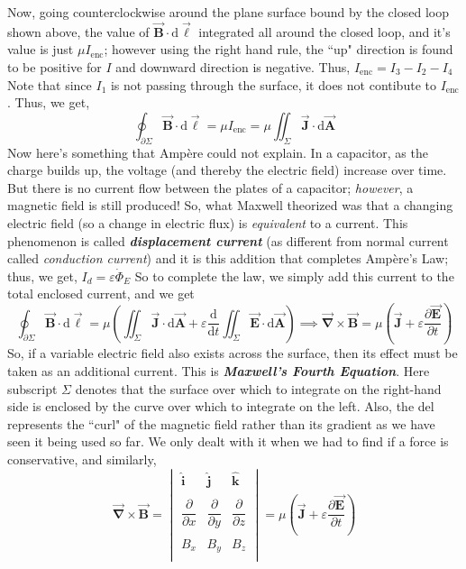 \documentclass{scrartcl}
\begin{document}
    Now, going counterclockwise around the plane surface bound by the closed loop shown above, the value of $\vec{\mathbf B}\cdot\mathrm d\vec{\mathbf\ell}$ integrated all around the closed loop, and it's value is just $\mu I_\text{enc}$; however using the right hand rule, the ``up" direction is found to be positive for $I$ and downward direction is negative. Thus, $\boxed{I_\text{enc}=I_3-I_2-I_4}$ Note that since $I_1$ is not passing through the surface, it does not contibute to $I_\text{enc}$. Thus, we get, \[\oint_{\partial \Sigma}\vec{\mathbf B}\cdot\mathrm d\vec{\mathbf\ell}=\mu I_\text{enc}=\mu\iint_\Sigma\vec{\mathbf J}\cdot\mathrm d\vec{\mathbf A}\] Now here's something that Amp\`ere could not explain. In a capacitor, as the charge builds up, the voltage (and thereby the electric field) increase over time. But there is no current flow between the plates of a capacitor; \textit{however}, a magnetic field is still produced! So, what Maxwell theorized was that a changing electric field (so a change in electric flux) is \textit{equivalent} to a current. This phenomenon is called \textit{\textbf{displacement current}} (as different from normal current called \textit{conduction current}) and it is this addition that completes Amp\`ere's Law; thus, we get, $\boxed{I_d=\varepsilon\dot\Phi_E}$ So to complete the law, we simply add this current to the total enclosed current, and we get \[\boxed{\oint_{\partial \Sigma}\vec{\mathbf B}\cdot\mathrm d\vec{\mathbf\ell}=\mu\left(\iint_\Sigma\vec{\mathbf J}\cdot\mathrm d\vec{\mathbf A}+\varepsilon\frac{\mathrm d}{\mathrm dt}\iint_\Sigma\vec{\mathbf E}\cdot\mathrm d\vec{\mathbf A}\right)}\implies\boxed{\vec{\mathbf\nabla}\times\vec{\mathbf B}=\mu\left(\vec{\mathbf J}+\varepsilon\frac{\partial\vec{\mathbf E}}{\partial t}\right)}\] So, if a variable electric field also exists across the surface, then its effect must be taken as an additional current. This is \textit{\textbf{Maxwell's Fourth Equation}}. Here subscript $\Sigma$ denotes that the surface over which to integrate on the right-hand side is enclosed by the curve over which to integrate on the left. Also, the del represents the ``curl" of the magnetic field rather than its gradient as we have seen it being used so far. We only dealt with it when we had to find if a force is conservative, and similarly, \[\vec{\mathbf \nabla}\times\vec{\mathbf B}=\begin{vmatrix} \mathbf{\hat i} & \mathbf{\hat j} & \mathbf{\hat k} \\\\\dfrac{\partial}{\partial x} & \dfrac{\partial}{\partial y} & \dfrac{\partial}{\partial z}\\\\B_x & B_y & B_z \\\end{vmatrix}=\mu\left(\vec{\mathbf J}+\varepsilon\frac{\partial\vec{\mathbf E}}{\partial t}\right)\]
\end{document}
